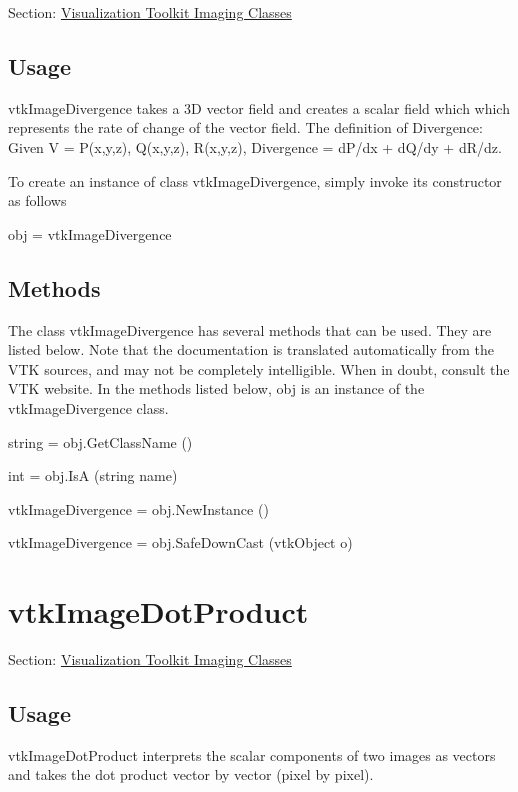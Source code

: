 Section\-: \hyperlink{sec_vtkimaging}{Visualization Toolkit Imaging Classes} \hypertarget{vtkwidgets_vtkxyplotwidget_Usage}{}\subsection{Usage}\label{vtkwidgets_vtkxyplotwidget_Usage}
vtk\-Image\-Divergence takes a 3\-D vector field and creates a scalar field which which represents the rate of change of the vector field. The definition of Divergence\-: Given V = P(x,y,z), Q(x,y,z), R(x,y,z), Divergence = d\-P/dx + d\-Q/dy + d\-R/dz.

To create an instance of class vtk\-Image\-Divergence, simply invoke its constructor as follows \begin{DoxyVerb}  obj = vtkImageDivergence
\end{DoxyVerb}
 \hypertarget{vtkwidgets_vtkxyplotwidget_Methods}{}\subsection{Methods}\label{vtkwidgets_vtkxyplotwidget_Methods}
The class vtk\-Image\-Divergence has several methods that can be used. They are listed below. Note that the documentation is translated automatically from the V\-T\-K sources, and may not be completely intelligible. When in doubt, consult the V\-T\-K website. In the methods listed below, {\ttfamily obj} is an instance of the vtk\-Image\-Divergence class. 
\begin{DoxyItemize}
\item {\ttfamily string = obj.\-Get\-Class\-Name ()}  
\item {\ttfamily int = obj.\-Is\-A (string name)}  
\item {\ttfamily vtk\-Image\-Divergence = obj.\-New\-Instance ()}  
\item {\ttfamily vtk\-Image\-Divergence = obj.\-Safe\-Down\-Cast (vtk\-Object o)}  
\end{DoxyItemize}\hypertarget{vtkimaging_vtkimagedotproduct}{}\section{vtk\-Image\-Dot\-Product}\label{vtkimaging_vtkimagedotproduct}
Section\-: \hyperlink{sec_vtkimaging}{Visualization Toolkit Imaging Classes} \hypertarget{vtkwidgets_vtkxyplotwidget_Usage}{}\subsection{Usage}\label{vtkwidgets_vtkxyplotwidget_Usage}
vtk\-Image\-Dot\-Product interprets the scalar components of two images as vectors and takes the dot product vector by vector (pixel by pixel).

